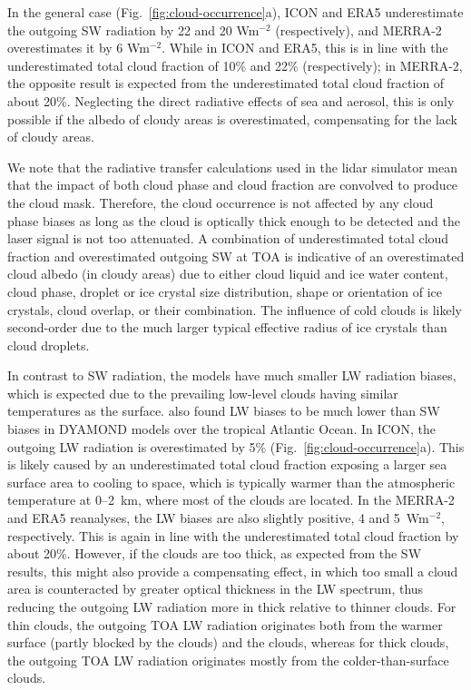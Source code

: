 \documentclass[draft]{agujournal2019}
\begin{document}
In the general case (Fig.~\ref{fig:cloud-occurrence}a), ICON and ERA5 underestimate the outgoing SW radiation by 22 and 20 Wm$^{-2}$ (respectively), and MERRA-2 overestimates it by 6 Wm$^{-2}$. While in ICON and ERA5, this is in line with the underestimated total cloud fraction of 10\% and 22\% (respectively); in MERRA-2, the opposite result is expected from the underestimated total cloud fraction of about 20\%. Neglecting the direct radiative effects of sea and aerosol, this is only possible if the albedo of cloudy areas is overestimated, compensating for the lack of cloudy areas.

We note that the radiative transfer calculations used in the lidar simulator mean that the impact of both cloud phase and cloud fraction are convolved to produce the cloud mask. Therefore, the cloud occurrence is not affected by any cloud phase biases as long as the cloud is optically thick enough to be detected and the laser signal is not too attenuated. A combination of underestimated total cloud fraction and overestimated outgoing SW at TOA is indicative of an overestimated cloud albedo (in cloudy areas) due to either cloud liquid and ice water content, cloud phase, droplet or ice crystal size distribution, shape or orientation of ice crystals, cloud overlap, or their combination. The influence of cold clouds is likely second-order due to the much larger typical effective radius of ice crystals than cloud droplets.

In contrast to SW radiation, the models have much smaller LW radiation biases, which is expected due to the prevailing low-level clouds having similar temperatures as the surface.  also found LW biases to be much lower than SW biases in DYAMOND models over the tropical Atlantic Ocean. In ICON, the outgoing LW radiation is overestimated by 5\% (Fig.~\ref{fig:cloud-occurrence}a). This is likely caused by an underestimated total cloud fraction exposing a larger sea surface area to cooling to space, which is typically warmer than the atmospheric temperature at 0–2~km, where most of the clouds are located. In the MERRA-2 and ERA5 reanalyses, the LW biases are also slightly positive, 4 and 5~Wm$^{-2}$, respectively. This is again in line with the underestimated total cloud fraction by about 20\%. However, if the clouds are too thick, as expected from the SW results, this might also provide a compensating effect, in which too small a cloud area is counteracted by greater optical thickness in the LW spectrum, thus reducing the outgoing LW radiation more in thick relative to thinner clouds. For thin clouds, the outgoing TOA LW radiation originates both from the warmer surface (partly blocked by the clouds) and the clouds, whereas for thick clouds, the outgoing TOA LW radiation originates mostly from the colder-than-surface clouds.
\end{document}
